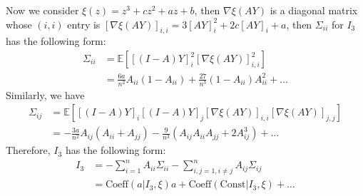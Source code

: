 \documentclass{article}
\def\E{\mathbb{E}}
\begin{document}
Now we consider $ \xi(z) = z^3 + cz^2 + az + b$, then $\nabla \xi (AY) $ is a diagonal matrix whose $(i,i)$ entry is 
 $[\nabla \xi (AY)]_{i,i} = 3 [AY]_i^2 + 2c [AY]_i + a $, then $\Sigma_{ii}$ for $I_3$ has the following form:
\begin{align*}
\Sigma_{ii} & = \E[ [(I-A)Y]_i^2 [\nabla \xi(AY)]_{i,i}^2] \\
& =  \frac{6a}{n^2} A_{ii}(1-A_{ii}) + \frac{27}{n^3} (1-A_{ii})A_{ii}^2 + \dots
\end{align*}
Similarly, we have
\begin{align*}
\Sigma_{ij} & = \E[ [(I-A)Y]_i [(I-A)Y]_j [\nabla \xi(AY)]_{i,i} [\nabla \xi(AY)]_{j,j}] \\
& = -\frac{3a}{n^2} A_{ij}(A_{ii}+A_{jj}) - \frac{9}{n^3}(A_{ij}A_{ii} A_{jj} + 2 A_{ij}^3) + \dots
\end{align*}
Therefore, $I_3$ has the following form:
\begin{align*}
I_3 & = - \sum_{i=1}^n A_{ii} \Sigma_{ii} - \sum_{i,j=1, i\neq j}^n A_{ij} \Sigma_{ij} \\
& = \textrm{Coeff}(a | I_3, \xi) a  + \textrm{Coeff}( \textrm{Const} | I_3, \xi) + \dots
\end{align*}
\end{document}
